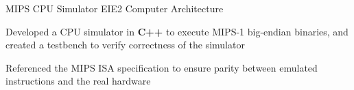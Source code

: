 \begin{cvprojects}
  \cvproject
  {MIPS CPU Simulator}
  {EIE2 Computer Architecture}
  {
      \begin{cvitems}
          \item Developed a CPU simulator in \textbf{C++} to execute MIPS-1 big-endian binaries, and created a testbench to verify correctness of the simulator
          \item Referenced the MIPS ISA specification to ensure parity between emulated instructions and the real hardware
      \end{cvitems}
  }




\end{cvprojects}
